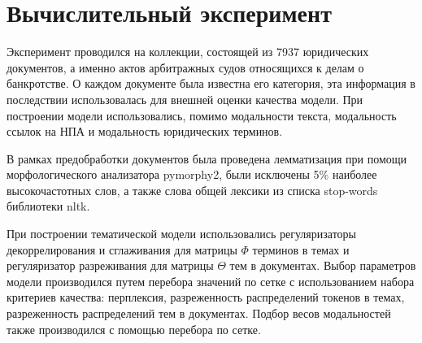 \documentclass[12pt,twoside]{article}
\begin{document}
\section{Вычислительный эксперимент}
Эксперимент проводился на коллекции, состоящей из 7937 юридических документов, а именно актов арбитражных судов относящихся к делам о банкротстве. О каждом документе была известна его категория, 
эта информация в последствии использовалась для внешней оценки качества модели. При построении модели использовались, помимо модальности текста, модальность ссылок на НПА и модальность юридических терминов. 

В рамках предобработки документов была проведена лемматизация при помощи морфологического анализатора pymorphy2, были исключены 5\% наиболее высокочастотных слов, а также слова общей лексики из списка stop-words библиотеки nltk.

При построении тематической модели использовались регуляризаторы декоррелирования и сглаживания для матрицы $\Phi$ терминов в темах и регуляризатор разреживания для матрицы $\Theta$ тем в документах. Выбор параметров модели производился путем перебора значений по сетке с использованием набора критериев качества: перплексия, разреженность распределений токенов в темах, разреженность распределений тем в документах. Подбор весов модальностей также производился с помощью перебора по сетке.



\end{document}
